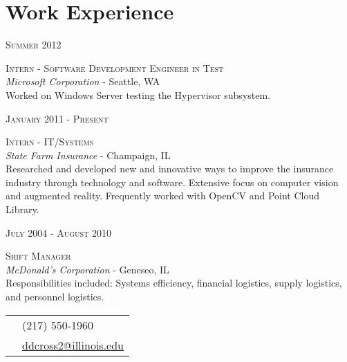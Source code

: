 \documentclass[10pt]{article}
\begin{document}
{{\begin{minipage}[t]{0.5\textwidth}
\section{Work Experience}

    \raggedleft
    \textsc{\normalsize Summer 2012}\par
    \raggedright\large \textsc{Intern - Software Development Engineer in Test} \\
    \emph{Microsoft Corporation} - Seattle, WA \\[5pt]

    \normalsize{ Worked on Windows Server testing the Hypervisor subsystem. \\[10pt]
    }

    \raggedleft
    \textsc{\normalsize January 2011 - Present}\par
    \raggedright\large \textsc{Intern - IT/Systems} \\
    \emph{State Farm Insurance} - Champaign, IL \\[5pt]

    \normalsize{
    Researched and developed new and innovative ways to improve the insurance industry
    through technology and software. Extensive focus on computer vision and augmented reality.
    Frequently worked with OpenCV and Point Cloud Library. \\[10pt]
    }

    \raggedleft
    \textsc{\normalsize July 2004 - August 2010}\par
    \raggedright\large \textsc{Shift Manager} \\
    \emph{McDonald's Corporation} - Geneseo, IL \\[5pt]

    \normalsize{
    Responsibilities included: Systems efficiency, financial logistics,
    supply logistics, and personnel logistics.\\[10pt]
    }


\end{minipage}
\hfill
\begin{minipage}[t]{0.44\textwidth}
    \vspace{0pt}

\colorbox{shade}{\textcolor{text1}{
    \begin{tabular}{c|p{7cm}}
        \raisebox{-3pt}{\Phone}         &(217) 550-1960\\
        \raisebox{-3pt}{\Envelope}  &\href{mailto:ddcross2@illinois.edu}
                                {ddcross2@illinois.edu}
    \end{tabular}
    }
}\\[10pt]



\end{minipage}}}
\end{document}

